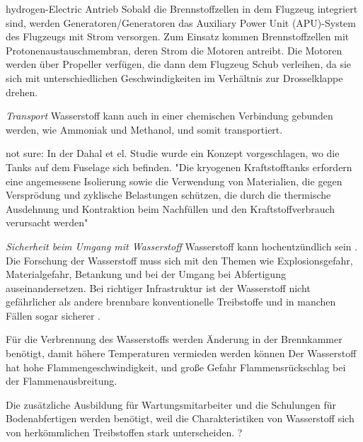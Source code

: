 hydrogen-Electric Antrieb
Sobald die Brennstoffzellen in dem Flugzeug integriert sind, werden Generatoren/Generatoren das 
Auxiliary Power Unit (APU)-System des Flugzeugs mit Strom versorgen. Zum Einsatz kommen Brennstoffzellen 
mit Protonenaustauschmembran, deren Strom die Motoren antreibt. Die Motoren werden über Propeller verfügen,
die dann dem Flugzeug Schub verleihen, da sie sich mit unterschiedlichen Geschwindigkeiten im Verhältnis zur Drosselklappe drehen.\cite{dalmia2022powering}

\textit{Transport}
Wasserstoff kann auch in einer chemischen Verbindung gebunden werden, wie Ammoniak und Methanol, und somit transportiert.

not sure:
\cite{dahal2021techno} In der Dahal et el. Studie wurde ein Konzept vorgeschlagen, wo die Tanks auf dem Fuselage sich befinden.
"Die kryogenen Kraftstofftanks erfordern eine angemessene Isolierung sowie die Verwendung von Materialien, die 
gegen Versprödung und zyklische Belastungen schützen, die durch die thermische Ausdehnung und Kontraktion beim Nachfüllen 
und den Kraftstoffverbrauch verursacht werden"


\textit{Sicherheit beim Umgang mit Wasserstoff}
Wasserstoff kann hochentzündlich sein \cite{dalmia2022powering}.
Die Forschung der Wasserstoff muss sich mit den Themen wie Explosionsgefahr, Materialgefahr, 
Betankung und bei der Umgang bei Abfertigung auseinandersetzen. 
Bei richtiger Infrastruktur ist der Wasserstoff nicht gefährlicher als andere brennbare konventionelle Treibstoffe und in manchen 
Fällen sogar sicherer \cite{khandelwal2013hydrogen}.

Für die Verbrennung des Wasserstoffs werden Änderung in der Brennkammer benötigt, damit höhere Temperaturen vermieden werden können \cite{khandelwal2013hydrogen}
Der Wasserstoff hat hohe Flammengeschwindigkeit, und große Gefahr Flammensrückschlag bei der Flammenausbreitung.

Die zusätzliche Ausbildung für Wartungsmitarbeiter und die Schulungen für Bodenabfertigen
werden benötigt, weil die Charakteristiken von Wasserstoff 
sich von herkömmlichen Treibstoffen stark unterscheiden. \cite{mulder2019outlook}?